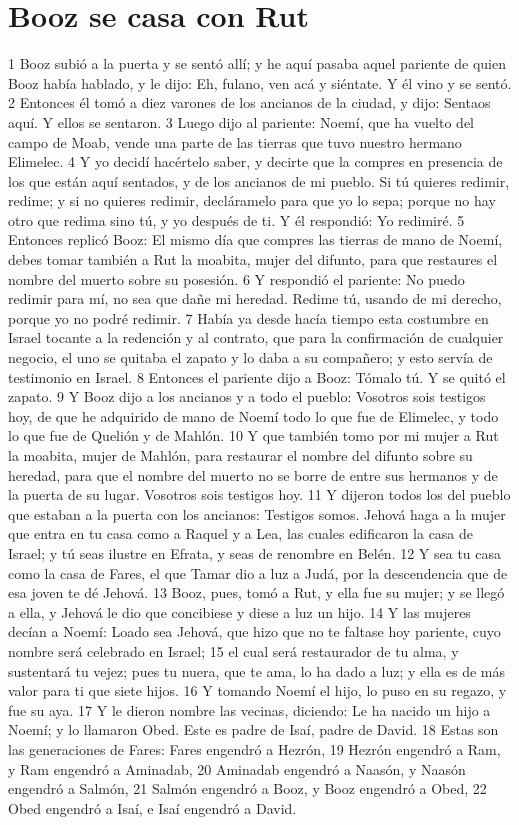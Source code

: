 \section*{Booz se casa con Rut}

1 Booz subió a la puerta y se sentó allí; y he aquí pasaba aquel pariente de quien Booz había hablado, y le dijo: Eh, fulano, ven acá y siéntate. Y él vino y se sentó.
2 Entonces él tomó a diez varones de los ancianos de la ciudad, y dijo: Sentaos aquí. Y ellos se sentaron.
3 Luego dijo al pariente: Noemí, que ha vuelto del campo de Moab, vende una parte de las tierras que tuvo nuestro hermano Elimelec.
4 Y yo decidí hacértelo saber, y decirte que la compres en presencia de los que están aquí sentados, y de los ancianos de mi pueblo. Si tú quieres redimir, redime; y si no quieres redimir, decláramelo para que yo lo sepa; porque no hay otro que redima sino tú, y yo después de ti. Y él respondió: Yo redimiré.
5 Entonces replicó Booz: El mismo día que compres las tierras de mano de Noemí, debes tomar también a Rut la moabita, mujer del difunto, para que restaures el nombre del muerto sobre su posesión.
6 Y respondió el pariente: No puedo redimir para mí, no sea que dañe mi heredad. Redime tú, usando de mi derecho, porque yo no podré redimir.
7 Había ya desde hacía tiempo esta costumbre en Israel tocante a la redención y al contrato, que para la confirmación de cualquier negocio, el uno se quitaba el zapato y lo daba a su compañero; y esto servía de testimonio en Israel.
8 Entonces el pariente dijo a Booz: Tómalo tú. Y se quitó el zapato. 
9 Y Booz dijo a los ancianos y a todo el pueblo: Vosotros sois testigos hoy, de que he adquirido de mano de Noemí todo lo que fue de Elimelec, y todo lo que fue de Quelión y de Mahlón.
10 Y que también tomo por mi mujer a Rut la moabita, mujer de Mahlón, para restaurar el nombre del difunto sobre su heredad, para que el nombre del muerto no se borre de entre sus hermanos y de la puerta de su lugar. Vosotros sois testigos hoy.
11 Y dijeron todos los del pueblo que estaban a la puerta con los ancianos: Testigos somos. Jehová haga a la mujer que entra en tu casa como a Raquel y a Lea, las cuales edificaron la casa de Israel; y tú seas ilustre en Efrata, y seas de renombre en Belén.
12 Y sea tu casa como la casa de Fares, el que Tamar dio a luz a Judá, por la descendencia que de esa joven te dé Jehová.
13 Booz, pues, tomó a Rut, y ella fue su mujer; y se llegó a ella, y Jehová le dio que concibiese y diese a luz un hijo.
14 Y las mujeres decían a Noemí: Loado sea Jehová, que hizo que no te faltase hoy pariente, cuyo nombre será celebrado en Israel;
15 el cual será restaurador de tu alma, y sustentará tu vejez; pues tu nuera, que te ama, lo ha dado a luz; y ella es de más valor para ti que siete hijos.
16 Y tomando Noemí el hijo, lo puso en su regazo, y fue su aya.
17 Y le dieron nombre las vecinas, diciendo: Le ha nacido un hijo a Noemí; y lo llamaron Obed. Este es padre de Isaí, padre de David.
18 Estas son las generaciones de Fares: Fares engendró a Hezrón,
19 Hezrón engendró a Ram, y Ram engendró a Aminadab,
20 Aminadab engendró a Naasón, y Naasón engendró a Salmón,
21 Salmón engendró a Booz, y Booz engendró a Obed,
22 Obed engendró a Isaí, e Isaí engendró a David.


